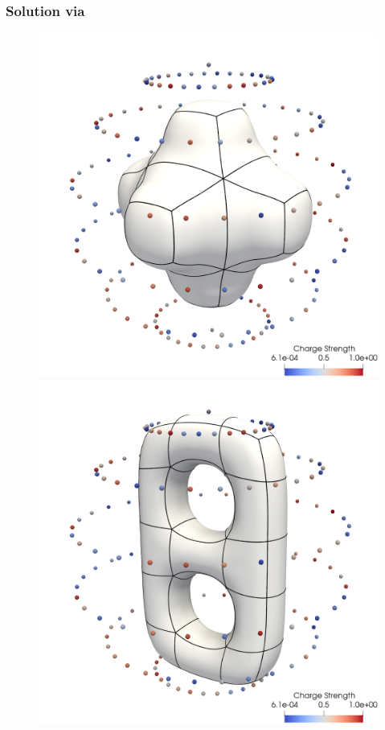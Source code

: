 \subsubsection{Solution via \gmres}

\begin{figure}[!htb]
  \centering
  \hfill
  \begin{minipage}{.5\textwidth}
      \centering
    \includegraphics[width=\linewidth]{figs/pipe_convergence_setup}
  \end{minipage}\hfill
  \begin{minipage}{.5\textwidth}
      \centering
    \includegraphics[width=\linewidth]{figs/ttorus2_convergence_setup}

\end{minipage}
\end{figure}
